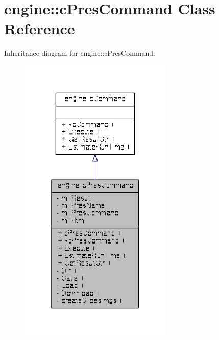 \hypertarget{classengine_1_1cPresCommand}{\section{engine\-:\-:c\-Pres\-Command Class Reference}
\label{classengine_1_1cPresCommand}
}


Inheritance diagram for engine\-:\-:c\-Pres\-Command\-:
\nopagebreak
\begin{figure}[H]
\begin{center}
\leavevmode
\includegraphics[width=208pt]{classengine_1_1cPresCommand__inherit__graph}
\end{center}
\end{figure}


